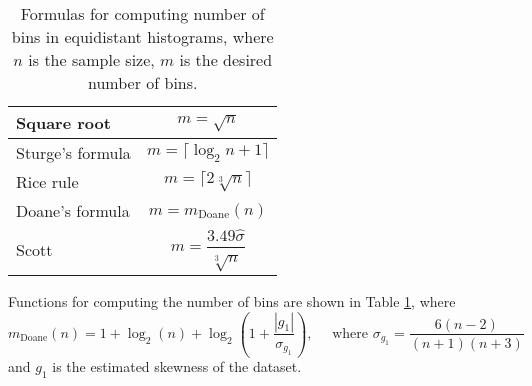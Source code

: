 \begin{table}[ht]
\centering
\begin{tabular}{|l | c|}
\hline 
\rule{0pt}{2.4ex} Square root & {$ m = \sqrt{n}$} \\%
\hline 
\rule{0pt}{2.4ex} Sturge's formula \cite{Sturges1926} &$ m = \lceil\log_2 n + 1\rceil$ \\ %
\hline
\rule{0pt}{2.4ex} Rice rule \cite{RiceRule}&  $m = \lceil 2 \sqrt[3]{n}\rceil$ \\ %
\hline
\rule{0pt}{2.4ex} Doane's formula \cite{Doane1976} &  $m =  m_{\mathrm{Doane}}(n)$ \\
\hline
\rule{0pt}{4ex} Scott \cite{Scott1979} &  $m = \dfrac{3.49 \hat{\sigma}}{\sqrt[3]{n}}$ \\
\hline
\end{tabular} 
\caption{Formulas for computing number of bins in equidistant histograms, where $n$ is the sample size, $m$ is the desired number of bins.}
\label{tab:histNbin}
\end{table}

\noindent Functions for computing the number of bins are shown in Table \ref{tab:histNbin}, where \[ m_{\mathrm{Doane}}(n) = 1 + \log_2 (n) + \log_2 \left( 1 + \dfrac{|g_1|}{\sigma_{g_1}} \right), \quad   \text{ where } \sigma_{g_1} = \frac{6(n-2)}{(n+1)(n+3)}\] and $g_1$ is the estimated skewness of the dataset. 
